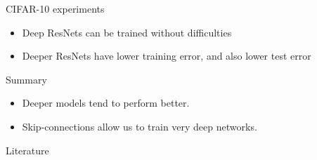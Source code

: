 \documentclass{beamer}
\begin{document}
	\begin{frame}{CIFAR-10 experiments} %
	\begin{center}
	\end{center}  
	\begin{itemize}
	\item Deep ResNets can be trained without difficulties
	\item Deeper ResNets have lower training error, and also lower test error
	\end{itemize} 
	\end{frame}
	 
	     \begin{frame}{Summary}
        \begin{itemize}
            \item Deeper models tend to perform better.
            \item Skip-connections allow us to train very deep networks.
        \end{itemize}
    \end{frame}

    \begin{frame}[allowframebreaks]{Literature}
        \printbibliography
    \end{frame}
    
\end{document}
